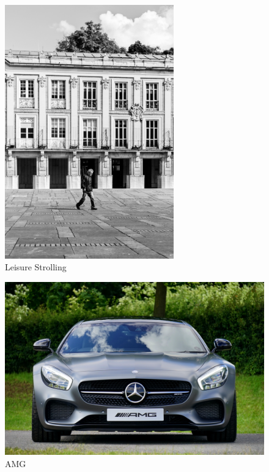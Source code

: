 \documentclass{article}
\begin{document}
\begin{figure}[!h]
\begin{center}
\includegraphics[width=0.65\textwidth]{latex.jpg}
\end{center}
\caption{Leisure Strolling}
\end{figure}
\pagebreak
\begin{figure}[!h]
\begin{center}
\includegraphics[width=1.0\textwidth]{car.jpg}
\end{center}
\caption{AMG}
\end{figure}
\pagebreak
\begin{table}[H]
\end{table}
\end{document}
